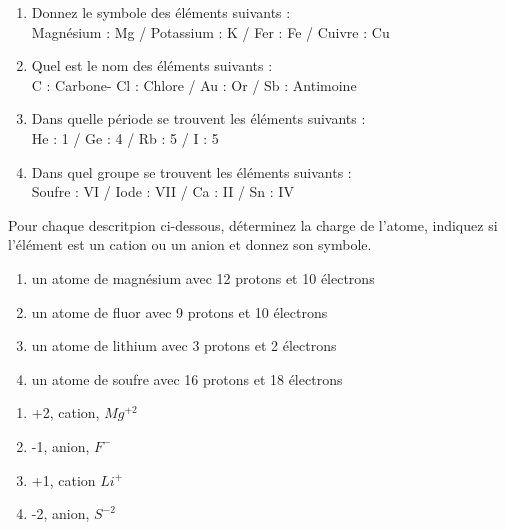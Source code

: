 \documentclass[
  11pt,
  french,
  a4paper,
  openany]{book}
\providecommand{\tightlist}{%
  \setlength{\itemsep}{0pt}\setlength{\parskip}{0pt}}
\begin{document}
\begin{Answer}

\begin{enumerate}
\def\labelenumi{\arabic{enumi}.}
\tightlist
\item
  Donnez le symbole des éléments suivants :\\
  Magnésium : Mg / Potassium : K / Fer : Fe / Cuivre : Cu
\item
  Quel est le nom des éléments suivants :\\
  C : Carbone- Cl : Chlore / Au : Or / Sb : Antimoine
\item
  Dans quelle période se trouvent les éléments suivants :\\
  He : 1 / Ge : 4 / Rb : 5 / I : 5
\item
  Dans quel groupe se trouvent les éléments suivants :\\
  Soufre : VI / Iode : VII / Ca : II / Sn : IV
\end{enumerate}


\end{Answer}

\begin{Exercise}

Pour chaque descritpion ci-dessous, déterminez la charge de l'atome, indiquez si l'élément est un cation ou un anion et donnez son symbole.

\begin{enumerate}
\def\labelenumi{\arabic{enumi}.}
\tightlist
\item
  un atome de magnésium avec 12 protons et 10 électrons\\
\item
  un atome de fluor avec 9 protons et 10 électrons\\
\item
  un atome de lithium avec 3 protons et 2 électrons\\
\item
  un atome de soufre avec 16 protons et 18 électrons
\end{enumerate}


\end{Exercise}

\begin{Answer}

\begin{enumerate}
\def\labelenumi{\arabic{enumi}.}
\tightlist
\item
  +2, cation, \(Mg^{+2}\)
\item
  -1, anion, \(F^-\)
\item
  +1, cation \(Li^+\)
\item
  -2, anion, \(S^{-2}\)
\end{enumerate}


\end{Answer}
\end{document}
